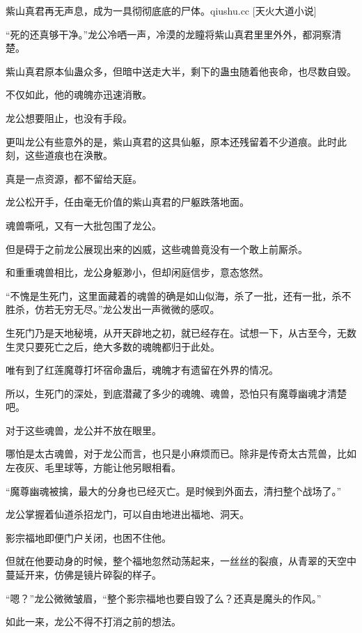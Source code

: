 
\begin{this_body}

紫山真君再无声息，成为一具彻彻底底的尸体。qiushu.cc [天火大道小说]

“死的还真够干净。”龙公冷哂一声，冷漠的龙瞳将紫山真君里里外外，都洞察清楚。

紫山真君原本仙蛊众多，但暗中送走大半，剩下的蛊虫随着他丧命，也尽数自毁。

不仅如此，他的魂魄亦迅速消散。

龙公想要阻止，也没有手段。

更叫龙公有些意外的是，紫山真君的这具仙躯，原本还残留着不少道痕。此时此刻，这些道痕也在涣散。

真是一点资源，都不留给天庭。

龙公松开手，任由毫无价值的紫山真君的尸躯跌落地面。

魂兽嘶吼，又有一大批包围了龙公。

但是碍于之前龙公展现出来的凶威，这些魂兽竟没有一个敢上前厮杀。

和重重魂兽相比，龙公身躯渺小，但却闲庭信步，意态悠然。

“不愧是生死门，这里面藏着的魂兽的确是如山似海，杀了一批，还有一批，杀不胜杀，仿若无穷无尽。”龙公发出一声微微的感叹。

生死门乃是天地秘境，从开天辟地之初，就已经存在。试想一下，从古至今，无数生灵只要死亡之后，绝大多数的魂魄都归于此处。

唯有到了红莲魔尊打坏宿命蛊后，魂魄才有遗留在外界的情况。

所以，生死门的深处，到底潜藏了多少的魂魄、魂兽，恐怕只有魔尊幽魂才清楚吧。

对于这些魂兽，龙公并不放在眼里。

哪怕是太古魂兽，对于龙公而言，也只是小麻烦而已。除非是传奇太古荒兽，比如左夜灰、毛里球等，方能让他另眼相看。

“魔尊幽魂被擒，最大的分身也已经灭亡。是时候到外面去，清扫整个战场了。”

龙公掌握着仙道杀招龙门，可以自由地进出福地、洞天。

影宗福地即便门户关闭，也困不住他。

但就在他要动身的时候，整个福地忽然动荡起来，一丝丝的裂痕，从青翠的天空中蔓延开来，仿佛是镜片碎裂的样子。

“嗯？”龙公微微皱眉，“整个影宗福地也要自毁了么？还真是魔头的作风。”

如此一来，龙公不得不打消之前的想法。


\end{this_body}
